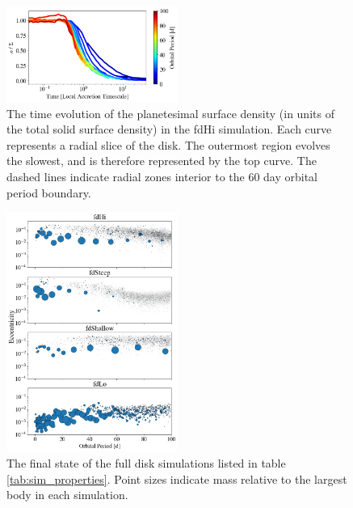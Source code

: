 \documentclass[twocolumn,linenumbers]{aastex63}
\begin{document}
\begin{figure}
\begin{center}
    \includegraphics[width=0.5\textwidth]{figures/pl_frac_time.png}
    \caption{The time evolution of the planetesimal surface density (in units of the total solid surface density) in the fdHi 
    simulation. Each curve represents a radial slice of the disk. The outermost region evolves the slowest, and is therefore 
    represented by the top curve. The dashed lines indicate radial zones interior to the 60 day orbital period boundary.\label{fig:pl_frac_time}}
\end{center}
\end{figure}

\begin{figure}
\begin{center}
    \includegraphics[width=0.5\textwidth]{figures/surfden_profiles.png}
    \caption{The final state of the full disk simulations listed in table \ref{tab:sim_properties}. 
    Point sizes indicate mass relative to the largest body in each simulation.\label{fig:surfden_profiles}}
\end{center}
\end{figure}
\end{document}
